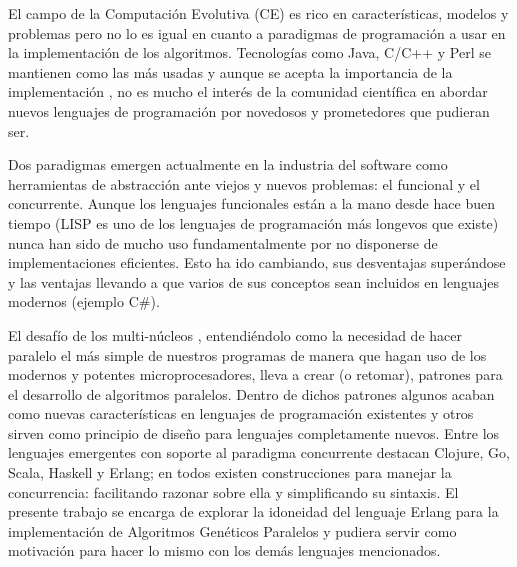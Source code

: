 
\noindent El campo de la Computación Evolutiva (CE) es rico en características, modelos y problemas pero no lo es igual en cuanto a paradigmas de programación a usar en la implementación de los algoritmos. Tecnologías como Java, C/C++ y Perl se mantienen como las más usadas y aunque se acepta la importancia de la implementación \cite{DBLP:conf/iwann/MereloRACML11}, no es mucho el interés de la comunidad científica en abordar nuevos lenguajes de programación por novedosos y prometedores que pudieran ser.

Dos paradigmas emergen actualmente en la industria del software como herramientas de abstracción ante viejos y nuevos problemas: el funcional y el concurrente. Aunque los lenguajes funcionales están a la mano desde hace buen tiempo (LISP es uno de los lenguajes de programación más longevos que existe) nunca han sido de mucho uso fundamentalmente por no disponerse de implementaciones eficientes. Esto ha ido cambiando, sus desventajas superándose y las ventajas llevando a que varios de sus conceptos sean incluidos en lenguajes modernos (ejemplo C\#).

El desafío de los multi-núcleos \cite{SutterL05}, entendiéndolo como la necesidad de hacer paralelo el más simple de nuestros programas de manera que hagan uso de los modernos y potentes microprocesadores, lleva a crear (o retomar), patrones para el desarrollo de algoritmos paralelos. Dentro de dichos patrones algunos acaban como nuevas características en lenguajes de programación existentes y otros sirven como principio de diseño para lenguajes completamente nuevos. Entre los lenguajes emergentes con soporte al paradigma concurrente destacan Clojure, Go, Scala, Haskell y Erlang; en todos existen construcciones para manejar la concurrencia: facilitando razonar sobre ella y simplificando su sintaxis. El presente trabajo se encarga de explorar la idoneidad del lenguaje Erlang para la implementación de Algoritmos Genéticos Paralelos y pudiera servir como motivación para hacer lo mismo con los demás lenguajes mencionados.

